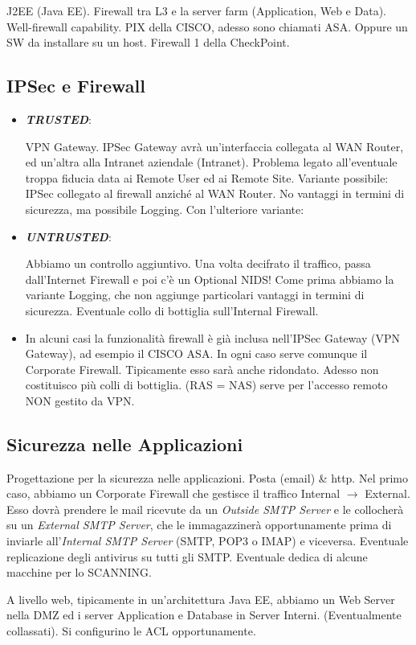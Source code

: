 J2EE (Java EE). Firewall tra L3 e la server farm (Application, Web e Data). Well-firewall capability. PIX della CISCO, adesso sono chiamati ASA. Oppure un SW da installare su un host. Firewall 1 della CheckPoint.

\subsection{IPSec e Firewall}

\begin{itemize}

\item{\textbf{\textit{TRUSTED}}}:

VPN Gateway. IPSec Gateway avrà un'interfaccia collegata al WAN Router, ed un'altra alla Intranet aziendale (Intranet). Problema legato all'eventuale troppa fiducia data ai Remote User ed ai Remote Site. Variante possibile: IPSec collegato al firewall anziché al WAN Router. No vantaggi in termini di sicurezza, ma possibile Logging. Con l'ulteriore variante:

\item{\textbf{\textit{UNTRUSTED}}}:

Abbiamo un controllo aggiuntivo. Una volta decifrato il traffico, passa dall'Internet Firewall e poi c'è un Optional NIDS! Come prima abbiamo la variante Logging, che non aggiunge particolari vantaggi in termini di sicurezza. Eventuale collo di bottiglia sull'Internal Firewall.

\item

In alcuni casi la funzionalità firewall è già inclusa nell'IPSec Gateway (VPN Gateway), ad esempio il CISCO ASA. In ogni caso serve comunque il Corporate Firewall. Tipicamente esso sarà anche ridondato. Adesso non costituisco più colli di bottiglia. (RAS = NAS) serve per l'accesso remoto NON gestito da VPN.

\end{itemize}

\subsection{Sicurezza nelle Applicazioni}

Progettazione per la sicurezza nelle applicazioni. Posta (email) \& http. Nel primo caso, abbiamo un Corporate Firewall che gestisce il traffico Internal $\rightarrow$ External. Esso dovrà prendere le mail ricevute da un \textit{Outside SMTP Server} e le collocherà su un \textit{External SMTP Server}, che le immagazzinerà opportunamente prima di inviarle all'\textit{Internal SMTP Server} (SMTP, POP3 o IMAP) e viceversa. Eventuale replicazione degli antivirus su tutti gli SMTP. Eventuale dedica di alcune macchine per lo SCANNING.

A livello web, tipicamente in un'architettura Java EE, abbiamo un Web Server nella DMZ ed i server Application e Database in Server Interni. (Eventualmente collassati). Si configurino le ACL opportunamente.